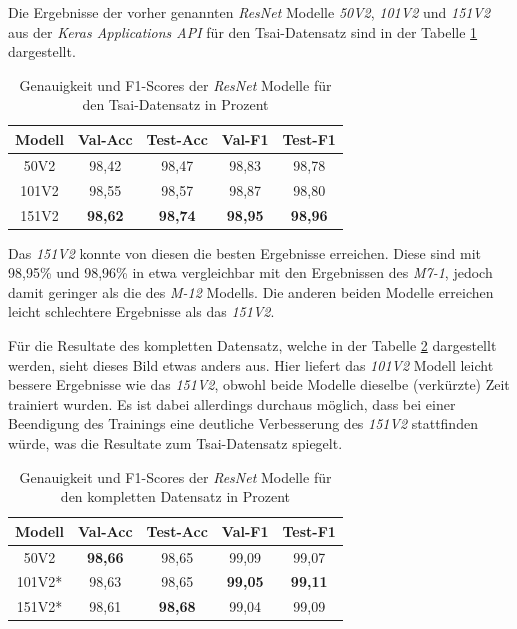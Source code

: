 \documentclass[twoside,a4paper]{IEEEtran}
\begin{document}
Die Ergebnisse der vorher genannten \emph{ResNet} Modelle \emph{50V2}, \emph{101V2} und \emph{151V2} aus der \emph{Keras Applications API} für den Tsai-Datensatz sind in der Tabelle \ref{resnet_ergebnis_tsai} dargestellt.
\begin{table}[!htb]
	\caption{Genauigkeit und F1-Scores der \emph{ResNet} Modelle für den Tsai-Datensatz in Prozent}
	\label{resnet_ergebnis_tsai}
	\centering
	\begin{tabular}{|c|c|c|c|c|}
		\hline
		Modell & Val-Acc & Test-Acc & Val-F1 & Test-F1\\
		\hline
		\hline
	 	50V2 & 98,42 & 98,47 & 98,83 & 98,78\\
		\hline
		101V2 & 98,55 & 98,57 & 98,87 & 98,80\\
		\hline
		151V2 & \textbf{98,62} & \textbf{98,74} & \textbf{98,95} & \textbf{98,96}\\
		\hline 
	\end{tabular}
\end{table} 
Das \emph{151V2} konnte von diesen die besten Ergebnisse erreichen. Diese sind mit 98,95\% und 98,96\% in etwa vergleichbar mit den Ergebnissen des \emph{M7-1}, jedoch damit geringer als die des \emph{M-12} Modells. Die anderen beiden Modelle erreichen leicht schlechtere Ergebnisse als das \emph{151V2}. 

Für die Resultate des kompletten Datensatz, welche in der Tabelle \ref{resnet_ergebnis_full} dargestellt werden, sieht dieses Bild etwas anders aus. Hier liefert das \emph{101V2} Modell leicht bessere Ergebnisse wie das \emph{151V2}, obwohl beide Modelle dieselbe (verkürzte) Zeit trainiert wurden. Es ist dabei allerdings durchaus möglich, dass bei einer Beendigung des Trainings eine deutliche Verbesserung des \emph{151V2} stattfinden würde, was die Resultate zum Tsai-Datensatz spiegelt.
\begin{table}[!htb]
	\caption{Genauigkeit und F1-Scores der \emph{ResNet} Modelle für den kompletten Datensatz in Prozent}
	\label{resnet_ergebnis_full}
	\centering
	\begin{tabular}{|c|c|c|c|c|}
		\hline
		Modell & Val-Acc & Test-Acc & Val-F1 & Test-F1\\
		\hline
		\hline 
		50V2 & \textbf{98,66} & 98,65 & 99,09 & 99,07\\
		\hline
		101V2* & 98,63 & 98,65 & \textbf{99,05} & \textbf{99,11}\\
		\hline
		151V2* & 98,61 & \textbf{98,68} & 99,04 & 99,09\\
		\hline 
	\end{tabular}
\end{table}
\end{document}
